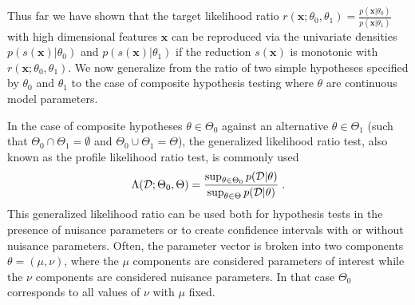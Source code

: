 \documentclass[12pt]{article}
\numberwithin{equation}{section}
\theoremstyle{plain}
\begin{document}
Thus far we have shown that the target likelihood ratio
$r(\mathbf{x};\theta_0,\theta_1)=\frac{p(\mathbf{x}|\theta_0)}{p(\mathbf{x}|\theta_1)}$
with high dimensional features $\mathbf{x}$ can be reproduced via the univariate
densities $p(s(\mathbf{x})|\theta_0)$ and $p(s(\mathbf{x})|\theta_1)$ if the
reduction $s(\mathbf{x})$ is monotonic with $r(\mathbf{x};\theta_0,\theta_1)$.
We now generalize from the ratio of two simple hypotheses specified by
$\theta_0$ and $\theta_1$ to the case of composite hypothesis testing where
$\theta$ are continuous model parameters.
%
%
%
%


In the case of composite hypotheses $\theta \in \Theta_0$ against an alternative
$\theta \in \Theta_1$ (such that $\Theta_0 \cap \Theta_1 = \emptyset$ and $\Theta_0 \cup \Theta_1 = \Theta$), the
generalized likelihood ratio test, also known as the profile likelihood ratio
test, is commonly used
\begin{equation}\label{eqn:generalized-lr}
\Lambda({\cal D}; \Theta_0, \Theta) =  \frac{ \sup_{\theta \in \Theta_0} p({\cal D} | \theta)}{ \sup_{\theta \in \Theta} p({\cal D} | \theta)} \; .
\end{equation}
This generalized likelihood ratio can be used both for hypothesis tests in the
presence of nuisance parameters or to create confidence intervals with or
without nuisance parameters.  Often, the parameter vector is broken into two
components $\theta=(\mu,\nu)$, where the $\mu$ components are considered
parameters of interest while the $\nu$ components are considered nuisance
parameters. In that case $\Theta_0$ corresponds to all values of $\nu$ with
$\mu$ fixed.
\end{document}
